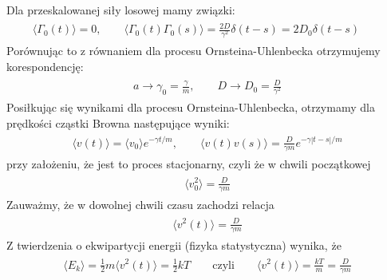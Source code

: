 \documentclass[a4paper,12pt,polish]{sphinxmanual}
\begin{document}
Dla przeskalowanej siły losowej mamy związki:
\label{ch3/chIII032:equation-eqn28}\begin{gather}
\begin{split}\langle \Gamma_0(t)\rangle = 0, \qquad \langle \Gamma_0(t) \Gamma_0(s)\rangle = \frac{2D}{\gamma^2} \delta(t-s) = 2D_0 \delta(t-s) \qquad\end{split}\label{ch3/chIII032-eqn28}
\end{gather}
Porównując to z równaniem dla procesu Ornsteina-Uhlenbecka otrzymujemy korespondencję:
\label{ch3/chIII032:equation-eqn29}\begin{gather}
\begin{split}a \to \gamma_0 = \frac{\gamma}{m}, \qquad D \to D_0 = \frac{D}{\gamma^2}\end{split}\label{ch3/chIII032-eqn29}
\end{gather}
Posiłkując się wynikami dla procesu Ornsteina-Uhlenbecka, otrzymamy dla prędkości cząstki Browna następujące wyniki:
\label{ch3/chIII032:equation-eqn30}\begin{gather}
\begin{split}\langle v(t) \rangle = \langle v_0\rangle e^{-\gamma t/m}, \qquad \langle v(t) v(s) \rangle = \frac{D}{\gamma m} e^{-\gamma |t-s|/m}\end{split}\label{ch3/chIII032-eqn30}
\end{gather}
przy założeniu, że jest to proces stacjonarny, czyli że w chwili początkowej
\label{ch3/chIII032:equation-eqn31}\begin{gather}
\begin{split}\langle v_0^2 \rangle = \frac{D}{\gamma m}\end{split}\label{ch3/chIII032-eqn31}
\end{gather}
Zauważmy, że w dowolnej chwili czasu zachodzi relacja
\label{ch3/chIII032:equation-eqn32}\begin{gather}
\begin{split}\langle v^2(t) \rangle = \frac{D}{\gamma m}\end{split}\label{ch3/chIII032-eqn32}
\end{gather}
Z twierdzenia o ekwipartycji energii (fizyka statystyczna) wynika, że
\label{ch3/chIII032:equation-eqn33}\begin{gather}
\begin{split}\langle E_k \rangle = \frac{1}{2} m \langle v^2(t) \rangle = \frac{1}{2} kT \qquad \mbox{czyli} \qquad \langle v^2(t) \rangle = \frac{kT}{m} = \frac{D}{\gamma m}\end{split}\label{ch3/chIII032-eqn33}
\end{gather}
\end{document}
